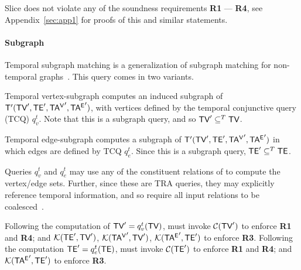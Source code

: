 
Slice does not violate any of the soundness requirements {\bf R1} ---
{\bf R4}, see Appendix~\ref{sec:app1} for proofs of this and similar
statements.

\paragraph*{Subgraph}  Temporal subgraph matching is a generalization of
subgraph matching for non-temporal graphs~\cite{Wood2012}.  This query
comes in two variants.


Temporal vertex-subgraph  computes an induced
subgraph of \tve $\mathsf{T}'(\textsf{TV}', \textsf{TE}', \mathsf{TA^{V}}', \mathsf{TA^{E}}')$, with vertices
defined by the temporal conjunctive query (TCQ) $q^t_v$.  Note that
this is a subgraph query, and so $\textsf{TV}' \subseteq^T \textsf{TV}$.


Temporal edge-subgraph  computes a subgraph of \ttt
$\mathsf{T}'(\textsf{TV}', \textsf{TE}', \mathsf{TA^{V}}', \mathsf{TA^{E}}')$ in which edges are defined by TCQ
$q^t_e$.  Since this is a subgraph query, $\textsf{TE}' \subseteq^T \textsf{TE}$.

Queries $q^t_v$ and $q^t_e$ may use any of the constituent relations
of \tve to compute the vertex/edge sets.  Further, since these
are TRA queries, they may explicitly reference temporal information,
and so require all input relations to be
coalesced~\cite{DBLP:reference/db/Bohlen09}.

Following the computation of $\textsf{TV}' = q^t_v(\textsf{TV})$, 
must invoke $\mathcal{C}(\textsf{TV}')$ to enforce {\bf R1} and {\bf R4}; and
$\mathcal{K}(\textsf{TE}',\textsf{TV}')$, $\mathcal{K}(\mathsf{TA^{V}}',\textsf{TV}')$, $\mathcal{K}(\mathsf{TA^{E}}',\textsf{TE}')$
to enforce {\bf R3}.
%
Following the computation $\textsf{TE}' = q^t_e(\textsf{TE})$,  must
invoke $\mathcal{C}(\textsf{TE}')$ to enforce {\bf R1} and {\bf R4}; and
$\mathcal{K}(\mathsf{TA^{E}}',\textsf{TE}')$ to enforce {\bf R3}.  %

